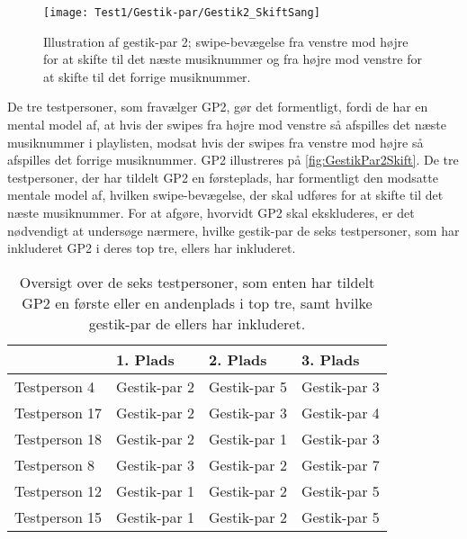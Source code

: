 %
\begin{figure}[H]
	\centering
	\texttt{[image: Test1/Gestik-par/Gestik2\_SkiftSang]}
	\caption{Illustration af gestik-par 2; swipe-bevægelse fra venstre mod højre for at skifte til det næste musiknummer og fra højre mod venstre for at skifte til det forrige musiknummer.}
	\label{fig:GestikPar2Skift}
\end{figure}
\noindent
%
De tre testpersoner, som fravælger GP2, gør det formentligt, fordi de har en mental model af, at hvis der swipes fra højre mod venstre så afspilles det næste musiknummer i playlisten, modsat hvis der swipes fra venstre mod højre så afspilles det forrige musiknummer. GP2 illustreres på \autoref{fig:GestikPar2Skift}. De tre testpersoner, der har tildelt GP2 en førsteplads, har formentligt den modsatte mentale model af, hvilken swipe-bevægelse, der skal udføres for at skifte til det næste musiknummer. For at afgøre, hvorvidt GP2 skal ekskluderes, er det nødvendigt at undersøge nærmere, hvilke gestik-par de seks testpersoner, som har inkluderet GP2 i deres top tre, ellers har inkluderet. 
%
\begin{table}[H]
	\centering
	\begin{tabular}{ | p{3cm} | p{3cm} | p{3cm} | p{3cm} |}
	\hline
		 & 1. Plads & 2. Plads & 3. Plads \\ \hline
		Testperson 4 & Gestik-par 2 & Gestik-par 5 & Gestik-par 3 \\ \hline
		Testperson 17 & Gestik-par 2 & Gestik-par 3 & Gestik-par 4 \\ \hline
		Testperson 18 & Gestik-par 2 & Gestik-par 1 & Gestik-par 3 \\ \hline
		Testperson 8 & Gestik-par 3 & Gestik-par 2 & Gestik-par 7 \\ \hline
		Testperson 12 & Gestik-par 1 & Gestik-par 2 & Gestik-par 5\\ \hline
		Testperson 15 & Gestik-par 1 & Gestik-par 2 & Gestik-par 5 \\ \hline
	\end{tabular}
	\caption{Oversigt over de seks testpersoner, som enten har tildelt GP2 en første eller en andenplads i top tre, samt hvilke gestik-par de ellers har inkluderet.}
	\label{tab:GestikPar2ITopTre}
\end{table}
\noindent
%
